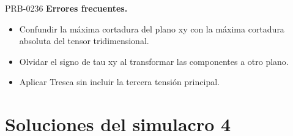 \begin{studiumworked}{PRB-0236}
\textbf{Errores frecuentes.}\begin{itemize}\item Confundir la máxima cortadura del plano xy con la máxima cortadura absoluta del tensor tridimensional.
\item Olvidar el signo de tau xy al transformar las componentes a otro plano.
\item Aplicar Tresca sin incluir la tercera tensión principal.\end{itemize}

\end{studiumworked}

\chapter{Soluciones del simulacro 4}


\Needspace{.3\textheight}

